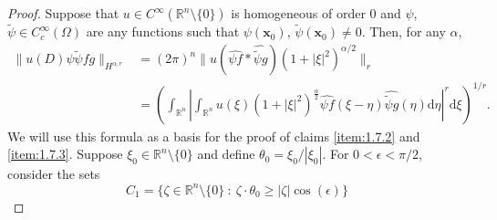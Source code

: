 \documentclass[a4paper,12pt]{amsart}
\numberwithin{equation}{section}
\theoremstyle{plain}
\numberwithin{theorem}{section}
\theoremstyle{definition}
\theoremstyle{remark}
\theoremstyle{remark}
\theoremstyle{remark}
\newcommand{\dd}{\mathrm{d}}  %
\newcommand{\vx}{{\mathbf{x}}}
\begin{document}
\begin{proof}
    Suppose that $u \in C^\infty(\mathbb{R}^n \setminus\{0\})$
    is homogeneous of order $0$ and $\psi$, $\widetilde{\psi} \in C_c^\infty(\Omega)$
    are any functions such that $\psi(\vx_0)$, $\widetilde{\psi}(\vx_0)\neq 0$. Then, for any $\alpha$,
    \begin{equation} \label{eq:tHarest}
    \begin{split}
    \|u(D)\psi \widetilde{\psi} f g \|_{H^{\alpha,r}} & =(2\pi)^n  \| u(\widehat{\psi f}
    \ast \widehat{\widetilde{\psi} g}) ( 1+ |\xi|^2)^{\alpha/2} \|_{r}\\
    & = \left (\int_{\mathbb{R}^n} \left | \int_{\mathbb{R}^n} u(\xi) (1+|\xi|^2)^{\frac{\alpha}{2}} \widehat{\psi f}(\xi-\eta) \widehat{\widetilde{\psi} g}(\eta) \dd \eta \right |^r \dd \xi \right )^{1/r}.
    \end{split}
    \end{equation}
    We will use this formula as a basis for the proof of claims \eqref{item:1.7.2} and \eqref{item:1.7.3}.
    Suppose $\xi_0 \in \mathbb{R}^n \setminus\{0\}$ and define $\theta_0 = \xi_0/|\xi_0|$. For $0<\epsilon<\pi/2$, consider the sets
    \[
    C_1 = \{\zeta \in \mathbb{R}^n \setminus \{0\} \ : \ \zeta \cdot \theta_0 \geq |\zeta| \cos(\epsilon) \}%
\]
\end{proof}
\end{document}
